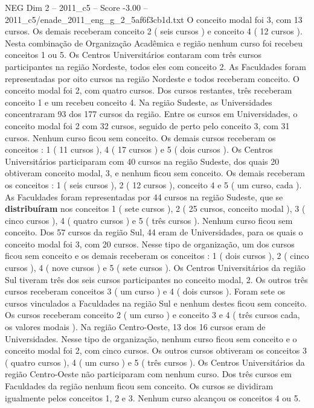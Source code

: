 \begin{textsample}{NEG Dim 2 – 2011\_c5 – Score -3.00 – 2011\_c5/enade\_2011\_eng\_g\_2\_5af6f3cb1d.txt}
O conceito modal foi 3, com 13 cursos.
Os demais receberam conceito 2 ( seis cursos ) e conceito 4 ( 12 cursos ).
Nesta combinação de Organização Acadêmica e região nenhum curso foi recebeu conceitos 1 ou 5.
Os Centros Universitários contaram com três cursos participantes na região Nordeste, todos eles com conceito 2.
As Faculdades foram representadas por oito cursos na região Nordeste e todos receberam conceito.
O conceito modal foi 2, com quatro cursos.
Dos cursos restantes, três receberam conceito 1 e um recebeu conceito 4.
Na região Sudeste, as Universidades concentraram 93 dos 177 cursos da região.
Entre os cursos em Universidades, o conceito modal foi 2 com 32 cursos, seguido de perto pelo conceito 3, com 31 cursos.
Nenhum curso ficou sem conceito.
Os demais cursos receberam os conceitos : 1 ( 11 cursos ), 4 ( 17 cursos ) e 5 ( dois cursos ).
Os Centros Universitários participaram com 40 cursos na região Sudeste, dos quais 20 obtiveram conceito modal, 3, e nenhum ficou sem conceito.
Os demais receberam os conceitos : 1 ( seis cursos ), 2 ( 12 cursos ), conceito 4 e 5 ( um curso, cada ).
As Faculdades foram representadas por 44 cursos na região Sudeste, que se \textbf{distribuíram} nos conceitos 1 ( sete cursos ), 2 ( 25 cursos, conceito modal ), 3 ( cinco cursos ), 4 ( quatro cursos ) e 5 ( três cursos ).
Nenhum curso ficou sem conceito.
Dos 57 cursos da região Sul, 44 eram de Universidades, para os quais o conceito modal foi 3, com 20 cursos.
Nesse tipo de organização, um dos cursos ficou sem conceito e os demais receberam os conceitos : 1 ( dois cursos ), 2 ( cinco cursos ), 4 ( nove cursos ) e 5 ( sete cursos ).
Os Centros Universitários da região Sul tiveram três dos seis cursos participantes no conceito modal, 2.
Os outros três cursos receberam conceitos 3 ( um curso ) e 4 ( dois cursos ).
Foram sete os cursos vinculados a Faculdades na região Sul e nenhum destes ficou sem conceito.
Os cursos receberam conceito 2 ( um curso ) e conceito 3 e 4 ( três cursos cada, os valores modais ).
Na região Centro-Oeste, 13 dos 16 cursos eram de Universidades.
Nesse tipo de organização, nenhum curso ficou sem conceito e o conceito modal foi 2, com cinco cursos.
Os outros cursos obtiveram os conceitos 3 ( quatro cursos ), 4 ( um curso ) e 5 ( três cursos ).
Os Centros Universitários da região Centro-Oeste não participaram com nenhum curso.
Dos três cursos em Faculdades da região nenhum ficou sem conceito.
Os cursos se dividiram igualmente pelos conceitos 1, 2 e 3.
Nenhum curso alcançou os conceitos 4 ou 5.

\end{textsample}
